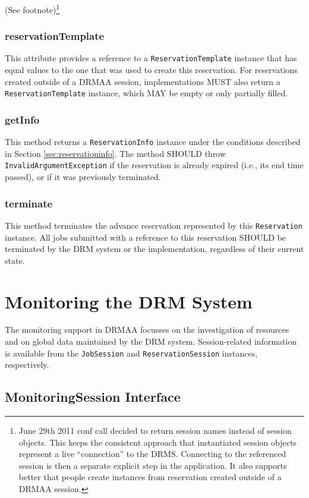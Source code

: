\documentclass{article}
\newcommand{\h}[1]{\lstinline|#1|}
\newcommand{\rat}[1]{ {\tiny(See footnote)}\footnote{#1} }
\begin{document}
\rat{June 29th 2011 conf call decided to return session names instead of session objects. This keeps the consistent approach that instantiated session objects represent a live ``connection'' to the DRMS. Connecting to the referenced session is then a separate explicit step in the application. It also supports better that people create instances from reservation created outside of a DRMAA session.
}

\subsubsection{reservationTemplate}

This attribute provides a reference to a \h{ReservationTemplate} instance that has equal values to the one that was used to create this reservation. For reservations created outside of a DRMAA session, implementations MUST also return a \h{ReservationTemplate} instance, which MAY be empty or only partially filled.

\subsubsection{getInfo}
This method returns a \h{ReservationInfo} instance under the conditions described in Section \ref{sec:reservationinfo}. The method SHOULD throw \h{InvalidArgumentException} if the reservation is already expired (i.e., its end time passed), or if it was previously terminated. 

\subsubsection{terminate}

This method terminates the advance reservation represented by this \h{Reservation} instance. All jobs submitted with a reference to this reservation SHOULD be terminated by the DRM system or the implementation, regardless of their current state.

\section{Monitoring the DRM System}

The monitoring support in DRMAA focusses on the investigation of resources and on global data maintained by the DRM system. Session-related information is available from the \h{JobSession} and \h{ReservationSession} instances, respectively.

\subsection{MonitoringSession Interface}
\label{sec:monitoringsession}
\end{document}
